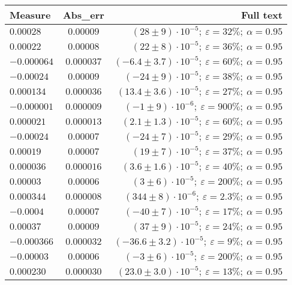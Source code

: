 \documentclass{article}%
\begin{document}
\begin{longtable}{| l | c | r |}%
\hline%
\rowcolor{lightgray}%
\textbf{Measure}&\textbf{Abs\_err}&\textbf{Full text}\\%
\hline%
$0.00028$&$0.00009$&$(28 \pm 9) \cdot 10 ^{-5};\:\varepsilon = 32\%; \: \alpha = 0.95$\\%
\hline%
$0.00022$&$0.00008$&$(22 \pm 8) \cdot 10 ^{-5};\:\varepsilon = 36\%; \: \alpha = 0.95$\\%
\hline%
$-0.000064$&$0.000037$&$(-6.4 \pm 3.7) \cdot 10 ^{-5};\:\varepsilon = 60\%; \: \alpha = 0.95$\\%
\hline%
$-0.00024$&$0.00009$&$(-24 \pm 9) \cdot 10 ^{-5};\:\varepsilon = 38\%; \: \alpha = 0.95$\\%
\hline%
$0.000134$&$0.000036$&$(13.4 \pm 3.6) \cdot 10 ^{-5};\:\varepsilon = 27\%; \: \alpha = 0.95$\\%
\hline%
$-0.000001$&$0.000009$&$(-1 \pm 9) \cdot 10 ^{-6};\:\varepsilon = 900\%; \: \alpha = 0.95$\\%
\hline%
$0.000021$&$0.000013$&$(2.1 \pm 1.3) \cdot 10 ^{-5};\:\varepsilon = 60\%; \: \alpha = 0.95$\\%
\hline%
$-0.00024$&$0.00007$&$(-24 \pm 7) \cdot 10 ^{-5};\:\varepsilon = 29\%; \: \alpha = 0.95$\\%
\hline%
$0.00019$&$0.00007$&$(19 \pm 7) \cdot 10 ^{-5};\:\varepsilon = 37\%; \: \alpha = 0.95$\\%
\hline%
$0.000036$&$0.000016$&$(3.6 \pm 1.6) \cdot 10 ^{-5};\:\varepsilon = 40\%; \: \alpha = 0.95$\\%
\hline%
$0.00003$&$0.00006$&$(3 \pm 6) \cdot 10 ^{-5};\:\varepsilon = 200\%; \: \alpha = 0.95$\\%
\hline%
$0.000344$&$0.000008$&$(344 \pm 8) \cdot 10 ^{-6};\:\varepsilon = 2.3\%; \: \alpha = 0.95$\\%
\hline%
$-0.0004$&$0.00007$&$(-40 \pm 7) \cdot 10 ^{-5};\:\varepsilon = 17\%; \: \alpha = 0.95$\\%
\hline%
$0.00037$&$0.00009$&$(37 \pm 9) \cdot 10 ^{-5};\:\varepsilon = 24\%; \: \alpha = 0.95$\\%
\hline%
$-0.000366$&$0.000032$&$(-36.6 \pm 3.2) \cdot 10 ^{-5};\:\varepsilon = 9\%; \: \alpha = 0.95$\\%
\hline%
$-0.00003$&$0.00006$&$(-3 \pm 6) \cdot 10 ^{-5};\:\varepsilon = 200\%; \: \alpha = 0.95$\\%
\hline%
$0.000230$&$0.000030$&$(23.0 \pm 3.0) \cdot 10 ^{-5};\:\varepsilon = 13\%; \: \alpha = 0.95$\\%
\hline%

\end{longtable}
\end{document}

